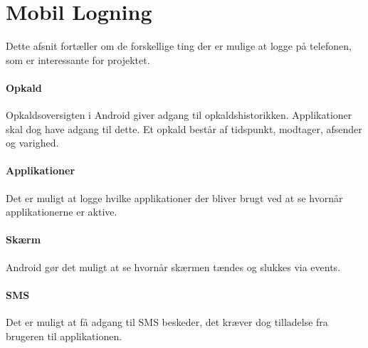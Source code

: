 \section{Mobil Logning}\label{logning}
Dette afsnit fortæller om de forskellige ting der er mulige at logge på telefonen, som er interessante for projektet.

\paragraph{Opkald}
Opkaldsoversigten i Android giver adgang til opkaldshistorikken.
Applikationer skal dog have adgang til dette.
Et opkald består af tidspunkt, modtager, afsender og varighed.

\paragraph{Applikationer}
Det er muligt at logge hvilke applikationer der bliver brugt ved at se hvornår applikationerne er aktive.

\paragraph{Skærm}
Android gør det muligt at se hvornår skærmen tændes og slukkes via events.  

\paragraph{SMS}
Det er muligt at få adgang til SMS beskeder, det kræver dog tilladelse fra brugeren til applikationen.